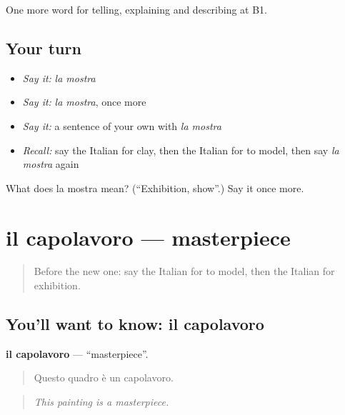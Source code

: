 \begin{grammarlens}[title={What you've built}]
One more word for telling, explaining and describing at B1.
\end{grammarlens}

\subsection*{Your turn}
\begin{itemize}
\raggedright
  \item \emph{Say it:} \emph{la mostra}
  \item \emph{Say it:} \emph{la mostra}, once more
  \item \emph{Say it:} a sentence of your own with \emph{la mostra}
  \item \emph{Recall:} say the Italian for clay, then the Italian for to model, then say \emph{la mostra} again
\end{itemize}

\begin{tcolorbox}[breakable,colback=teal!4,colframe=teal!35!black,title={Before you move on}]
What does la mostra mean? (\textquotedblleft{}Exhibition, show\textquotedblright{}.) Say it once more.
\end{tcolorbox}
\section[il capolavoro]{il capolavoro — masterpiece}

\label{lesson:IT-C523-capolavoro}



\begin{quote}
Before the new one: say the Italian for to model, then the Italian for exhibition.
\end{quote}

\subsection*{You'll want to know: il capolavoro}
\textbf{il capolavoro} — \textquotedblleft{}masterpiece\textquotedblright{}.

\begin{quote}
Questo quadro è un capolavoro.
\end{quote}

\begin{quote}
\emph{This painting is a masterpiece.}
\end{quote}

